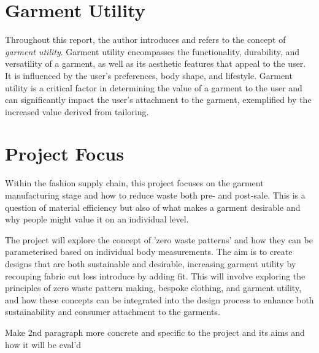 \section{Garment Utility}
Throughout this report, the author introduces and refers to the concept of \textit{garment utility}. Garment utility encompasses the functionality, durability, and versatility of a garment, as well as its aesthetic features that appeal to the user. It is influenced by the user's preferences, body shape, and lifestyle. Garment utility is a critical factor in determining the value of a garment to the user and can significantly impact the user's attachment to the garment, exemplified by the increased value derived from tailoring. 

\section{Project Focus}
Within the fashion supply chain, this project focuses on the garment manufacturing stage and how to reduce waste both pre- and post-sale. This is a question of material efficiency but also of what makes a garment desirable and why people might value it on an individual level. 

The project will explore the concept of 'zero waste patterns' and how they can be parameterised based on individual body measurements. The aim is to create designs that are both sustainable and desirable, increasing garment utility by recouping fabric cut loss introduce by adding fit. This will involve exploring the principles of zero waste pattern making, bespoke clothing, and garment utility, and how these concepts can be integrated into the design process to enhance both sustainability and consumer attachment to the garments.

Make 2nd paragraph more concrete and specific to the project and its aims and how it will be eval'd

